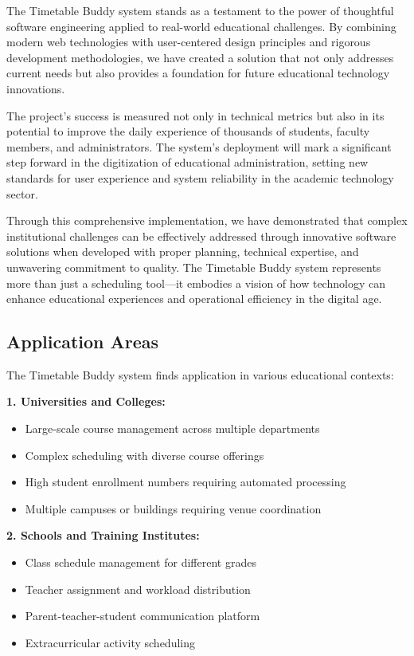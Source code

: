 The Timetable Buddy system stands as a testament to the power of thoughtful software engineering applied to real-world educational challenges. By combining modern web technologies with user-centered design principles and rigorous development methodologies, we have created a solution that not only addresses current needs but also provides a foundation for future educational technology innovations.

The project's success is measured not only in technical metrics but also in its potential to improve the daily experience of thousands of students, faculty members, and administrators. The system's deployment will mark a significant step forward in the digitization of educational administration, setting new standards for user experience and system reliability in the academic technology sector.

Through this comprehensive implementation, we have demonstrated that complex institutional challenges can be effectively addressed through innovative software solutions when developed with proper planning, technical expertise, and unwavering commitment to quality. The Timetable Buddy system represents more than just a scheduling tool—it embodies a vision of how technology can enhance educational experiences and operational efficiency in the digital age.

\subsection{Application Areas}

The Timetable Buddy system finds application in various educational contexts:

\textbf{1. Universities and Colleges:}
\begin{itemize}
    \item Large-scale course management across multiple departments
    \item Complex scheduling with diverse course offerings
    \item High student enrollment numbers requiring automated processing
    \item Multiple campuses or buildings requiring venue coordination
\end{itemize}

\textbf{2. Schools and Training Institutes:}
\begin{itemize}
    \item Class schedule management for different grades
    \item Teacher assignment and workload distribution
    \item Parent-teacher-student communication platform
    \item Extracurricular activity scheduling
\end{itemize}

